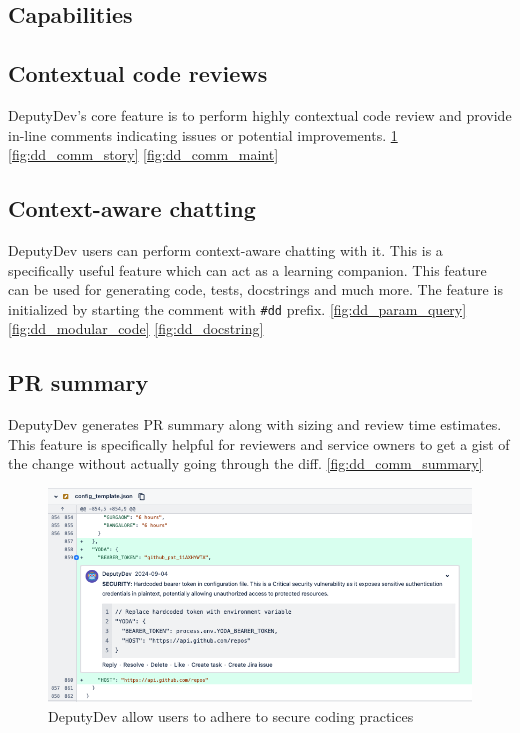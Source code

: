 \begin{appendices}
\section{Capabilities}
\label{app:capabilities}
\subsection{Contextual code reviews}
DeputyDev's core feature is to perform highly contextual code review and provide in-line comments indicating issues or potential improvements. \ref{fig:dd_comm_security} \ref{fig:dd_comm_story} \ref{fig:dd_comm_maint}

\subsection{Context-aware chatting}
DeputyDev users can perform context-aware chatting with it. This is a specifically useful feature which can act as a learning companion. This feature can be used for generating code, tests, docstrings and much more. The feature is initialized by starting the comment with \texttt{\#dd} prefix. \ref{fig:dd_param_query} \ref{fig:dd_modular_code} \ref{fig:dd_docstring}

\subsection{PR summary}
DeputyDev generates PR summary along with sizing and review time estimates. This feature is specifically helpful for reviewers and service owners to get a gist of the change without actually going through the diff. \ref{fig:dd_comm_summary}

\begin{figure}[htbp]
    \centering
    \includegraphics[scale=0.40]
    {Figures/dd_comm_security.png}
    \caption{DeputyDev allow users to adhere to secure coding practices}
    \label{fig:dd_comm_security}
\end{figure}


\end{appendices}
